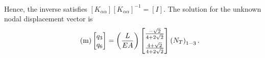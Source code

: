 \documentclass{AeroStructure-ERJohnson}
\begin{document}
\begin{example}
\begin{align}
\end{align}
Hence, the inverse satisfies $\left[K_{\alpha \alpha}\right]\left[K_{\alpha \alpha}\right]^{-1}=[I]$. The solution for the unknown nodal displacement vector is
\begin{align}\label{eq16.2m}\tag{m}
\left[\begin{array}{@{}l@{}}q_{3} \\q_{6}\end{array}\right]=\left(\frac{L}{E A}\right)\left[\begin{array}{@{}l@{}}\frac{-\sqrt{2}}{4+2 \sqrt{2}} \\[6pt]\frac{4+\sqrt{2}}{4+2 \sqrt{2}}\end{array}\right]\left(N_{T}\right)_{1-3}.
\end{align}

\vspace*{-1pc}


\end{example}
\end{document}
